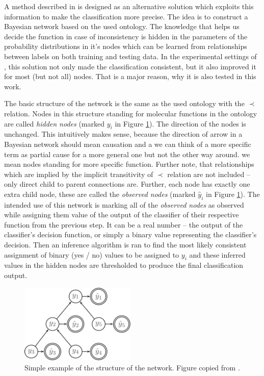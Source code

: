 \documentclass[11pt,twoside,a4paper]{book}
\begin{document}
A method described in \cite{bnet} is designed
as an alternative solution which exploits this
information to make the classification more precise.
The idea is to construct a Bayesian network based on
the used ontology.
The knowledge that helps us decide the function
in case of inconsistency
is hidden in the parameters of the probability 
distributions in it's nodes 
which can be learned from relationships between
labels on both training and testing data.
In the experimental settings of \cite{bnet},
this solution not only made the classification 
consistent,
but it also improved it for most (but not all) nodes.
That is a major reason, why it is also tested in this work.

The basic structure of the network is the same as the used ontology 
with the $\prec$ relation. 
Nodes in this structure standing for molecular functions
in the ontology are called \emph{hidden nodes} (marked $y_i$ in Figure \ref{fig:net}). 
The direction of the nodes is unchanged.
This intuitively makes sense,
because the direction of arrow in a Bayesian 
network should mean causation
and a we can think of a more specific term as partial cause
for a more general one but not the other way around.
we mean nodes standing for more specific function.
Further note, that relationships which are implied by the implicit transitivity
of $\prec$ relation are not included -- only direct child to parent connections are.
Further, each node has exactly one extra child node, these
are called the \emph{observed nodes} (marked $\hat{y}_i$ in Figure \ref{fig:net}).
The intended use of this network
is marking all of the \emph{observed nodes} as observed
while assigning them value of the output 
of the classifier of their respective function from the previous step.
It can be a real number -- the output of the classifier's decision function,
or simply a binary value representing the classifier's decision.
Then an inference algorithm is ran
to find the most likely consistent assignment of binary (yes / no) values to be assigned to $y_i$
and these inferred values in the hidden nodes 
are thresholded to produce the final classification output.


\begin{figure}[h]
\begin{center}
\includegraphics[width=5.5cm]{figures/net}
\caption[Example of the structure of the Bayesian network]{Simple example of the structure of the network.
Figure copied from \cite{bnet}.}
\label{fig:net}
\end{center}
\end{figure}
\end{document}
